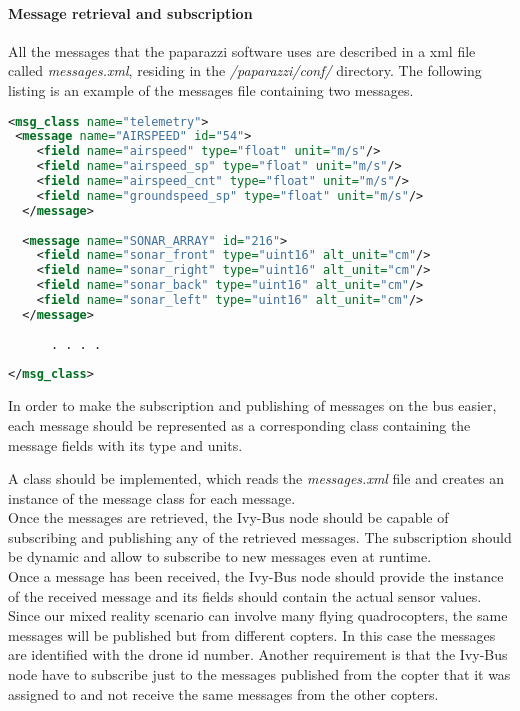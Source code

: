 \paragraph{Message retrieval and subscription}
\label{par:messageRetrieval}

All the messages that the paparazzi software uses are described in a xml file called \textit{messages.xml}, residing in the \textit{/paparazzi/conf/} directory. 
The following listing is an example of the messages file containing two messages.

\begin{lstlisting}[basicstyle=\tiny, caption={Message Xml Definition}, label={lst:MessageXml}, language = Xml]
<msg_class name="telemetry">
 <message name="AIRSPEED" id="54">
    <field name="airspeed" type="float" unit="m/s"/>
    <field name="airspeed_sp" type="float" unit="m/s"/>
    <field name="airspeed_cnt" type="float" unit="m/s"/>
    <field name="groundspeed_sp" type="float" unit="m/s"/>
  </message>
  
  <message name="SONAR_ARRAY" id="216">
	<field name="sonar_front" type="uint16" alt_unit="cm"/>
	<field name="sonar_right" type="uint16" alt_unit="cm"/>
	<field name="sonar_back" type="uint16" alt_unit="cm"/>
	<field name="sonar_left" type="uint16" alt_unit="cm"/>
  </message>
	
	  . . . . 
	  
</msg_class>
\end{lstlisting}

In order to make the subscription and publishing of messages on the bus easier, each message should be represented as a corresponding class containing the message fields with its type and units.

A class should be implemented, which reads the \textit{messages.xml} file and creates an instance of the message class for each message. \\
Once the messages are retrieved, the Ivy-Bus node should be capable of subscribing and publishing any of the retrieved messages. The subscription should be dynamic and allow to subscribe to new messages even at runtime. \\
Once a message has been received, the Ivy-Bus node should provide the instance of the received message and its fields should contain the actual sensor values.\\
Since our mixed reality scenario can involve many flying quadrocopters, the same messages will be published but from different copters.
In this case the messages are identified with the drone id number.
Another requirement is that the Ivy-Bus node have to subscribe just to the messages published from the copter that it was assigned to and not receive the same messages from the other copters.

